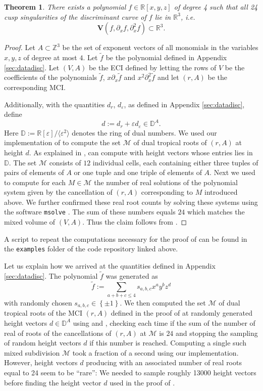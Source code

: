 \documentclass[a4paper]{article}
\newtheorem{theorem}{Theorem}
\theoremstyle{remark}
\newcommand{\set}[1]{\left\{#1\right\}}
\def\Var{\mathbf{V}}
\def\RR{\mathbb{R}}
\def\ZZ{\mathbb{Z}}
\begin{document}
\begin{theorem}
  \label{thm:disc}
  There exists a polynomial $f\in \RR[x,y,z]$ of degree 4 such that all
  24 cusp singularities of the discriminant curve of $f$ lie in $\RR^3$, i.e.
  \[\Var(f,\partial_xf,\partial_x^2f) \subset \RR^3.\]
\end{theorem}
\begin{proof}
  Let $A\subset \ZZ^3$ be the set of exponent vectors of all monomials in the
  variables $x,y,z$ of degree at most $4$. Let $\tilde{f}$ be the
  polynomial defined in Appendix \ref{sec:datadisc}. Let $(V,A)$ be the ECI
  defined by letting the rows of $V$ be the coefficients of the polynomials
  $\tilde{f}$, $x\partial_x\tilde{f}$ and $x^2\partial_x^2\tilde{f}$ and let $(r,A)$ be the
  corresponding MCI.

  Additionally, with the quantities
  $d_{r}$, $d_{\varepsilon}$, as defined in
  Appendix \ref{sec:datadisc}, define
  \[d := d_{r} + \varepsilon d_{\varepsilon} \in \mathbb{D}^A.\] Here
  $\mathbb{D} := \RR[\varepsilon]/\langle \varepsilon^2\rangle$ denotes the ring of dual numbers.  We
  used our implementation of  to compute the set
  $\mathcal{M}$ of dual tropical roots of $(r,A)$ at height $d$. As explained in
  ,  can compute with height vectors
  whose entries lies in $\mathbb{D}$. The set $\mathcal{M}$ consists of
  $12$ individual cells, each containing either three tuples of pairs
  of elements of $A$ or one tuple and one triple of elements of
  $A$. Next we used  to compute for each
  $M\in \mathcal{M}$ the number of real solutions of the polynomial system given
  by the cancellation of $(r,A)$ corresponding to $M$ introduced
  above. We further confirmed these real root counts by solving these
  systems using the software \texttt{msolve}
  \cite{berthomieu2021}. The sum of these numbers equals $24$ which
  matches the mixed volume of $(V,A)$. Thus the claim follows from
  .
\end{proof}

A script to repeat the computations necessary for the proof of
 can be found in the \texttt{examples} folder of the
code repository linked above.

Let us explain how we arrived at the quantities defined in Appendix
\ref{sec:datadisc}. The polynomial $\tilde{f}$ was generated as
\[\tilde{f} := \sum_{a + b + c \leq 4}s_{a,b,c}x^ay^bz^d\]
with randomly chosen $s_{a,b,c}\in \set{\pm 1}$. We then computed the set
$\mathcal{M}$ of dual tropical roots of the MCI $(r,A)$ defined in the proof of
 at randomly generated height vectors
$d\in \mathbb{D}^A$ using  and , checking
each time if the sum of the number of real of roots of the
cancellations of $(r, A)$ at $\mathcal{M}$ is $24$ and stopping the sampling of
random height vectors $d$ if this number is reached. Computing a
single such mixed subdivision $\mathcal{M}$ took a fraction of a second using
our implementation. However, height vectors $d$ producing with an
associated number of real roots equal to 24 seem to be ``rare'': We
needed to sample roughly 13000 height vectors before finding the
height vector $d$ used in the proof of .
\end{document}
